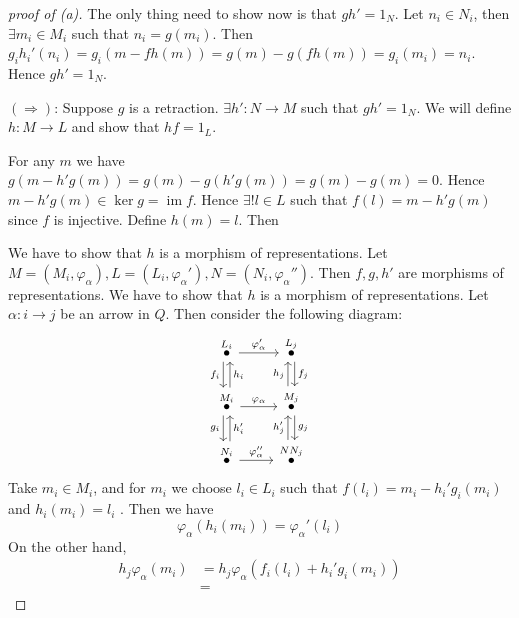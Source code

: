 \documentclass[11pt, a4paper]{report}
\begin{document}
\begin{proof}[proof of (a)]
The only thing need to show now is that $ gh'=1_N $. Let $ n_i \in N_i $, then $ \exists m_i \in M_i $ such that $ n_i =g(m_i) $. Then $ g_ih_i'(n_i)=g_i(m-fh(m))=g(m)-g(fh(m))=g_i(m_i)=n_i $. Hence $ gh'=1_N $.

$ (\Rightarrow )$: 
Suppose $ g $ is a retraction. $ \exists h': N\to M $ such that $ gh'=1_N $. We will define $ h: M\to L $ and show that $ hf=1_L $. 

For any $ m $ we have $ g(m-h'g(m))=g(m)-g(h'g(m))=g(m)-g(m)=0 $. Hence $ m-h'g(m) \in \operatorname{ker}g = \operatorname{im}f $. Hence $ \exists ! l \in L $ such that $ f(l)=m-h'g(m)  $ since $ f $ is injective. Define $ h(m)=l $. Then 

We have to show that $ h $ is a morphism of representations. Let $ M=(M_i,\varphi_\alpha), L=(L_i,\varphi_\alpha'), N=(N_i, \varphi_\alpha'') $. Then $ f,g,h' $ are morphisms of representations. We have to show that $ h $ is a morphism of representations. Let $ \alpha: i \to j $ be an arrow in $ Q $. Then consider the following diagram:
\[
    \begin{tikzcd}
        \overset{L_i}{\bullet} \arrow[d, "f_i"', shift right] \arrow[r, "\varphi_{\alpha}'"]                               & \overset{L_j}{\bullet} \arrow[d, "f_j", shift left]                              \\
        \overset{M_i}{\bullet} \arrow[d, "g_i"', shift right] \arrow[r, "\varphi_{\alpha}"] \arrow[u, "h_i"', shift right] & \overset{M_j}{\bullet} \arrow[d, "g_j", shift left] \arrow[u, "h_j", shift left] \\
        \overset{N_i}{\bullet} \arrow[r, "\varphi_{\alpha}''"] \arrow[u, "h_i'"', shift right]                             & \overset{NN_j}{\bullet} \arrow[u, "h_j'", shift left]                           
        \end{tikzcd}
\]
Take $ m_i \in M_i $, and for $ m_i $ we choose $ l_i \in L_i $ such that $ f(l_i)=m_i-h_i'g_i(m_i) $ and $ h_i(m_i)=l_i $ . Then we have
\[
\varphi_\alpha (h_i(m_i))=\varphi_\alpha' (l_i)
\]
On the other hand,
\begin{align*}
h_j\varphi_\alpha(m_i) & =h_j\varphi_\alpha(f_i(l_i)+h_i'g_i(m_i))\\
&= 
\end{align*}
\end{proof}
\end{document}
